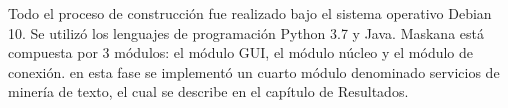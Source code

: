 Todo el proceso de construcción fue realizado bajo el sistema operativo Debian 10. Se utilizó los lenguajes de programación Python 3.7 y Java.
Maskana está compuesta por 3 módulos: el módulo GUI, el módulo núcleo y el módulo de conexión. en esta fase se implementó un cuarto módulo denominado servicios de minería de texto, el cual se describe en el capítulo de Resultados.



%
%
%
%
%
%
